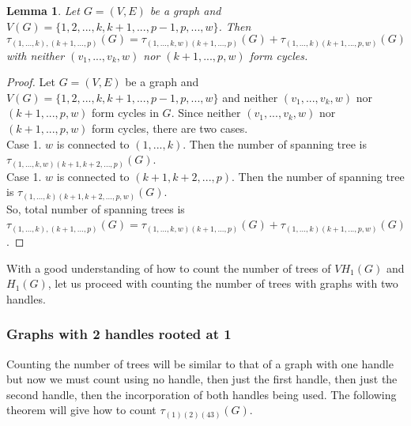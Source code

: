 \documentclass[twoside,11pt]{article}
\newtheorem{lemma}[theorem]{Lemma}
\numberwithin{equation}{section} \DeclareMathOperator{\Var}{Var}
\newcommand{\bpf}{\begin{proof}}
\newcommand{\epf}{\end{proof}}
\newcommand{\blm}{\begin{lemma}}
\newcommand{\elm}{\end{lemma}}
\begin{document}
\blm
\label{addedW}
Let $G=(V,E)$ be a graph and\\ $V(G)=\{1,2,...,k,k+1,...,p-1,p,...,w\}$.
Then $$\tau_{(1,...,k), (k+1,...,p)}(G)=\tau_{(1,...,k,w)(k+1,...,p)}(G)+\tau_{(1,...,k)(k+1,...,p,w)}(G)$$
with neither $(v_1,...,v_k,w)$ nor $(k+1,...,p,w)$ form cycles.
\elm

\bpf
Let $G=(V,E)$ be a graph and\\ $V(G)=\{1,2,...,k,k+1,...,p-1,p,...,w\}$ and neither $(v_1,...,v_k,w)$ nor $(k+1,...,p,w)$ form cycles in $G$.
Since neither $(v_1,...,v_k,w)$ nor $(k+1,...,p,w)$  form cycles, there are two cases. \\
Case 1. $w$ is connected to $(1,...,k)$. Then the number of spanning tree is $\tau_{(1,...,k,w)(k+1,k+2,...,p)}(G)$. \\
Case 1. $w$ is connected to $(k+1,k+2,...,p)$. Then the number of spanning tree is $\tau_{(1,...,k)(k+1,k+2,...,p,w)}(G)$. \\
So, total number of spanning trees is\\ $\tau_{(1,...,k), (k+1,...,p)}(G)=\tau_{(1,...,k,w)(k+1,...,p)}(G)+\tau_{(1,...,k)(k+1,...,p,w)}(G)$.
\epf

With a good understanding of how to count the number of trees of \(VH_{1}(G)\) and \(  H_{1}(G)\), let us proceed with counting the number of trees with graphs with two handles. 


\subsubsection{Graphs with 2 handles rooted at 1}
Counting the number of trees will be similar to that of a graph with one handle but now we must count using no handle, then just the first handle, then just the second handle, then the incorporation of both handles being used. The following theorem will give how to count \(\tau_{(1)(2)(43)}(G)\).
\end{document}
